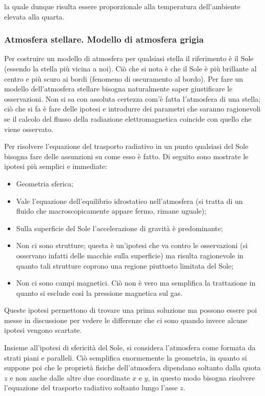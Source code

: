 la quale dunque risulta essere proporzionale alla temperatura dell'ambiente elevata alla quarta.

\subsubsection{Atmosfera stellare. Modello di atmosfera grigia}

Per costruire un modello di atmosfera per qualsiasi stella il riferimento è il Sole (essendo la stella più vicina a noi). Ciò che si nota è che il Sole è più brillante al centro e più scuro ai bordi (fenomeno di oscuramento al bordo). Per fare un modello dell'atmosfera stellare bisogna naturalmente saper giustificare le osservazioni. Non si sa con assoluta certezza com'è fatta l'atmosfera di una stella; ciò che si fa è fare delle ipotesi e introdurre dei parametri che saranno ragionevoli se il calcolo del flusso della radiazione elettromagnetica coincide con quello che viene osservato.

Per risolvere l'equazione del trasporto radiativo in un punto qualsiasi del Sole bisogna fare delle assunzioni su come esso è fatto. Di seguito sono mostrate le ipotesi più semplici e immediate:

\begin{itemize}
    \item Geometria sferica;
    \item Vale l'equazione dell'equilibrio idrostatico nell'atmosfera (si tratta di un fluido che macroscopicamente appare fermo, rimane uguale);
    \item Sulla superficie del Sole l'accelerazione di gravità è predominante;
    \item Non ci sono strutture; questa è un'ipotesi che va contro le osservazioni (si osservano infatti delle macchie sulla superficie) ma risulta ragionevole in quanto tali strutture coprono una regione piuttosto limitata del Sole;
    \item Non ci sono campi magnetici. Ciò non è vero ma semplifica la trattazione in quanto si esclude così la pressione magnetica sul gas.
\end{itemize}

Queste ipotesi permettono di trovare una prima soluzione ma possono essere poi messe in discussione per vedere le differenze che ci sono quando invece alcune ipotesi vengono scartate.

Insieme all'ipotesi di sfericità del Sole, si considera l'atmosfera come formata da strati piani e paralleli. Ciò semplifica enormemente la geometria, in quanto si suppone poi che le proprietà fisiche dell'atmosfera dipendano soltanto dalla quota $z$ e non anche dalle altre due coordinate $x$ e $y$, in questo modo bisogna risolvere l'equazione del trasporto radiativo soltanto lungo l'asse $z$.

